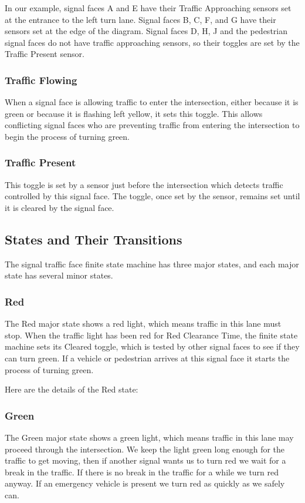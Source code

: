 \documentclass[letterpaper,twoside]{article}
\begin{document}
In our example, signal faces A and E have their Traffic Approaching
sensors set at the entrance to the left turn lane.  Signal faces
B, C, F, and G have their sensors set at the edge of the diagram.
Signal faces D, H, J and the pedestrian signal faces do not have traffic
approaching sensors,
so their toggles are set by the Traffic Present sensor.

\subsubsection{Traffic Flowing}

When a signal face is allowing traffic to enter the intersection, either
because it is green or because it is flashing left yellow, it sets this
toggle.  This allows conflicting signal faces who are preventing traffic
from entering the intersection to begin the process of turning green.

\subsubsection{Traffic Present}

This toggle is set by a sensor just before the intersection which detects
traffic controlled by this signal face.
The toggle, once set by the sensor,  remains set until it is cleared
by the signal face.

\subsection{States and Their Transitions}

The signal traffic face finite state machine has three major states,
and each major state has several minor states.

\subsubsection{Red}
The Red major state shows a red light, which means traffic in this
lane must stop.  When the traffic light has been red for Red Clearance Time,
the finite state machine sets its Cleared toggle, which is tested by other
signal faces to see if they can turn green.  If a vehicle or
pedestrian arrives at this signal face it starts the process
of turning green.

Here are the details of the Red state:
      


\subsubsection{Green}
The Green major state shows a green light, which means traffic in this lane
may proceed through the intersection.  We keep the light green long enough
for the traffic to get moving, then if another signal wants us to turn
red we wait for a break in the traffic.  If there is no break in the
traffic for a while we turn red anyway.  If an emergency vehicle is present
we turn red as quickly as we safely can.
\end{document}
